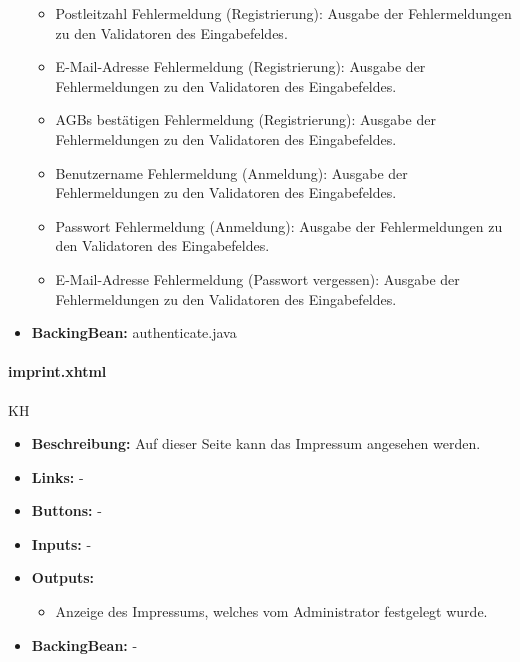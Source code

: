 \begin{itemize}
\begin{itemize}
							\item Postleitzahl Fehlermeldung (Registrierung): Ausgabe der Fehlermeldungen zu den Validatoren des Eingabefeldes.
							\item E-Mail-Adresse Fehlermeldung (Registrierung): Ausgabe der Fehlermeldungen zu den Validatoren des Eingabefeldes.
							\item AGBs bestätigen Fehlermeldung (Registrierung): Ausgabe der Fehlermeldungen zu den Validatoren des Eingabefeldes.
							\item Benutzername Fehlermeldung (Anmeldung): Ausgabe der Fehlermeldungen zu den Validatoren des Eingabefeldes.
							\item Passwort Fehlermeldung (Anmeldung): Ausgabe der Fehlermeldungen zu den Validatoren des Eingabefeldes.
							\item E-Mail-Adresse Fehlermeldung (Passwort vergessen): Ausgabe der Fehlermeldungen zu den Validatoren des Eingabefeldes.
						\end{itemize}
					\item \textbf{BackingBean:} authenticate.java
				\end{itemize}
				
				\paragraph{imprint.xhtml}
					KH\\
					\begin{itemize}
						\item \textbf{Beschreibung:} Auf dieser Seite kann das Impressum angesehen werden.
						\item \textbf{Links:} -
						\item \textbf{Buttons:} -
						\item \textbf{Inputs:} -
						\item \textbf{Outputs:} 
							\begin{itemize}
								\item	Anzeige des Impressums, welches vom Administrator festgelegt wurde.
							\end{itemize}
						\item \textbf{BackingBean:} -
					\end{itemize}
				
